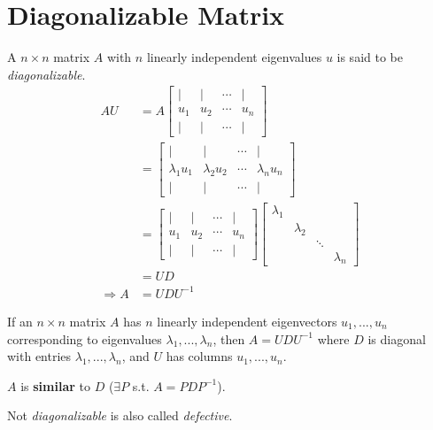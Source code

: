 \documentclass[11pt]{elegantbook}
\begin{document}
\section{Diagonalizable Matrix}
A $n\times n$ matrix $A$ with $n$ linearly independent eigenvalues $u$ is said to be \textit{diagonalizable}.
\begin{equation}
    \begin{aligned}
        AU&=A\begin{bmatrix}
            |&|&\cdots&|\\
            u_1&u_2&\cdots&u_n\\
            |&|&\cdots&|
        \end{bmatrix}\\
        &=\begin{bmatrix}
            |&|&\cdots&|\\
            \lambda_1u_1&\lambda_2u_2&\cdots&\lambda_nu_n\\
            |&|&\cdots&|
        \end{bmatrix}\\
        &=\begin{bmatrix}
            |&|&\cdots&|\\
            u_1&u_2&\cdots&u_n\\
            |&|&\cdots&|
        \end{bmatrix}\begin{bmatrix}
            \lambda_1&&&\\
            &\lambda_2&&\\
            &&\ddots&\\
            &&&\lambda_n
        \end{bmatrix}\\
        &=UD\\
        \Rightarrow	A&=UDU^{-1}
    \end{aligned}
    \nonumber
\end{equation}

\begin{theorem}
    If an $n\times n$ matrix $A$ has $n$ linearly independent eigenvectors $u_1,...,u_n$ corresponding to eigenvalues $\lambda_1,...,\lambda_n$, then $A = UDU^{-1}$ where $D$ is diagonal with entries $\lambda_1,...,\lambda_n$, and $U$ has columns $u_1,...,u_n$.
\end{theorem}
$A$ is \textbf{similar} to $D$ ($\exists P$ s.t. $A=PDP^{-1}$).

Not \textit{diagonalizable} is also called \textit{defective}.
\end{document}
